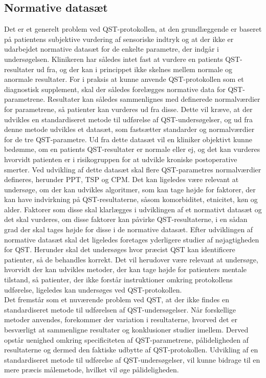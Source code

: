 \subsection{Normative datasæt} \label{Normativ_data} %
Det er et generelt problem ved QST-protokollen, at den grundlæggende er baseret på patientens subjektive vurdering af sensoriske indtryk og at der ikke er udarbejdet normative datasæt for de enkelte parametre, der indgår i undersøgelsen. Klinikeren har således intet fast at vurdere en patients QST-resultater ud fra, og der kan i princippet ikke skelnes mellem normale og anormale resultater. For i praksis at kunne anvende QST-protokollen som et diagnostisk supplement, skal der således forelægges normative data for QST-parametrene. Resultater kan således sammenlignes med definerede normalværdier for parametrene, så patienter kan vurderes ud fra disse. Dette vil kræve, at der udvikles en standardiseret metode til udførelse af QST-undersøgelser, og ud fra denne metode udvikles et datasæt, som fastsætter standarder og normalværdier for de tre QST-parametre. Ud fra dette datasæt vil en kliniker objektivt kunne bedømme, om en patients QST-resultater er normale eller ej, og det kan vurderes hvorvidt patienten er i risikogruppen for at udvikle kroniske postoperative smerter. Ved udvikling af dette datasæt skal flere QST-parametres normalværdier defineres, herunder PPT, TSP og CPM. Det kan ligeledes være relevant at undersøge, om der kan udvikles algoritmer, som kan tage højde for faktorer, der kan have indvirkning på QST-resultaterne, såsom komorbiditet, etnicitet, køn og alder. Faktorer som disse skal klarlægges i udviklingen af et normativt datasæt og det skal vurderes, om disse faktorer kan påvirke QST-resultaterne, i en sådan grad der skal tages højde for disse i de normative datasæt. Efter udviklingen af normative datasæt skal det ligeledes foretages yderligere studier af nøjagtigheden for QST. Herunder skal det undersøges hvor præcist QST kan identificere patienter, så de behandles korrekt.
Det vil herudover være relevant at undersøge, hvorvidt der kan udvikles metoder, der kan tage højde for patienters mentale tilstand, så patienter, der ikke forstår instruktioner omkring protokollens udførelse, ligeledes kan undersøges ved QST-protokollen. \\
Det fremstår som et nuværende problem ved QST, at der ikke findes en standardiseret metode til udførelsen af QST-undersøgelser. Når forskellige metoder anvendes, forekommer der variation i resultaterne, hvorved det er besværligt at sammenligne resultater og konklusioner studier imellem. Derved opstår uenighed omkring specificiteten af QST-parametrene, pålideligheden af resultaterne og dermed den faktiske udbytte af QST-protokollen. Udvikling af en standardiseret metode til udførelse af QST-undersøgelser, vil kunne bidrage til en mere præcis målemetode, hvilket vil øge pålideligheden.


